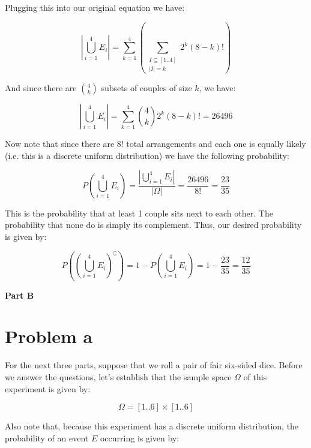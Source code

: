 \documentclass{article}
\begin{document}
Plugging this into our original equation we have:

\begin{equation*}
    \left|\bigcup_{i=1}^4 E_i\right|=\sum_{k=1}^4\left(\sum_{\substack{I\subseteq[1..4]\\|I|=k}}2^k(8-k)!\right)
\end{equation*}

And since there are $\binom{4}{k}$ subsets of couples of size $k$, we have:

\begin{equation*}
    \left|\bigcup_{i=1}^4 E_i\right|=\sum_{k=1}^4\binom{4}{k}2^k(8-k)!=26496
\end{equation*}

Now note that since there are $8!$ total arrangements and each one is equally likely (i.e. this is a discrete uniform distribution) we have the following probability:

\begin{equation*}
    P\left(\bigcup_{i=1}^4 E_i\right)=\frac{\left|\bigcup_{i=1}^4 E_i\right|}{|\Omega|}=\frac{26496}{8!}=\frac{23}{35}
\end{equation*}

This is the probability that at least 1 couple sits next to each other. The probability that none do is simply its complement. Thus, our desired probability is given by:

\begin{equation*}
    P\left(\left(\bigcup_{i=1}^4 E_i\right)^\complement\right)=1-P\left(\bigcup_{i=1}^4 E_i\right)=1-\frac{23}{35}=\frac{12}{35}
\end{equation*}

\pagebreak

\begin{center}
    \Large\textbf{Part B}
\end{center}

\section*{Problem a}
For the next three parts, suppose that we roll a pair of fair six-sided dice. Before we answer the questions, let's establish that the sample space $\Omega$ of this experiment is given by:

\begin{equation*}
    \Omega=[1..6]\times[1..6]
\end{equation*}

Also note that, because this experiment has a discrete uniform distribution, the probability of an event $E$ occurring is given by:
\end{document}
